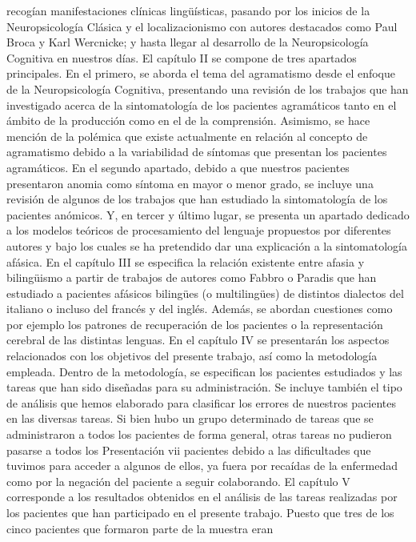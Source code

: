 recogían manifestaciones clínicas lingüísticas, pasando por los inicios de la
Neuropsicología Clásica y el localizacionismo con autores destacados como Paul
Broca y Karl Wercnicke; y hasta llegar al desarrollo de la Neuropsicología
Cognitiva en nuestros días.
El capítulo II se compone de tres apartados principales. En el primero, se
aborda el tema del agramatismo desde el enfoque de la Neuropsicología
Cognitiva, presentando una revisión de los trabajos que han investigado acerca de
la sintomatología de los pacientes agramáticos tanto en el ámbito de la producción
como en el de la comprensión. Asimismo, se hace mención de la polémica que
existe actualmente en relación al concepto de agramatismo debido a la
variabilidad de síntomas que presentan los pacientes agramáticos. En el segundo
apartado, debido a que nuestros pacientes presentaron anomia como síntoma en
mayor o menor grado, se incluye una revisión de algunos de los trabajos que han
estudiado la sintomatología de los pacientes anómicos. Y, en tercer y último lugar,
se presenta un apartado dedicado a los modelos teóricos de procesamiento del
lenguaje propuestos por diferentes autores y bajo los cuales se ha pretendido dar
una explicación a la sintomatología afásica.
En el capítulo III se especifica la relación existente entre afasia y
bilingüismo a partir de trabajos de autores como Fabbro o Paradis que han
estudiado a pacientes afásicos bilingües (o multilingües) de distintos dialectos del
italiano o incluso del francés y del inglés. Además, se abordan cuestiones como
por ejemplo los patrones de recuperación de los pacientes o la representación
cerebral de las distintas lenguas.
En el capítulo IV se presentarán los aspectos relacionados con los
objetivos del presente trabajo, así como la metodología empleada. Dentro de la
metodología, se especifican los pacientes estudiados y las tareas que han sido
diseñadas para su administración. Se incluye también el tipo de análisis que
hemos elaborado para clasificar los errores de nuestros pacientes en las diversas
tareas. Si bien hubo un grupo determinado de tareas que se administraron a todos
los pacientes de forma general, otras tareas no pudieron pasarse a todos los
Presentación vii
pacientes debido a las dificultades que tuvimos para acceder a algunos de ellos, ya
fuera por recaídas de la enfermedad como por la negación del paciente a seguir
colaborando.
El capítulo V corresponde a los resultados obtenidos en el análisis de las
tareas realizadas por los pacientes que han participado en el presente trabajo.
Puesto que tres de los cinco pacientes que formaron parte de la muestra eran
